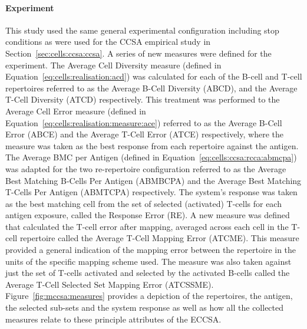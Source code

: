 %
%
\paragraph{Experiment}
This study used the same general experimental configuration including stop conditions as were used for the CCSA empirical study in Section~\ref{sec:cells:ccsa:ccsa}. 
A series of new measures were defined for the experiment. The Average Cell Diversity measure (defined in Equation~\ref{eq:cells:realisation:acd}) was calculated for each of the B-cell and T-cell repertoires referred to as the Average B-Cell Diversity (ABCD), and the Average T-Cell Diversity (ATCD) respectively. This treatment was performed to the Average Cell Error measure (defined in Equation~\ref{eq:cells:realisation:measure:ace}) referred to as the Average B-Cell Error (ABCE) and the Average T-Cell Error (ATCE) respectively, where the measure was taken as the best response from each repertoire against the antigen. The Average BMC per Antigen (defined in Equation~\ref{eq:cells:ccsa:rcca:abmcpa}) was adapted for the two re-repertoire configuration referred to as the Average Best Matching B-Cells Per Antigen (ABMBCPA) and the Average Best Matching T-Cells Per Antigen (ABMTCPA) respectively.
The system's response was taken as the best matching cell from the set of selected (activated) T-cells for each antigen exposure, called the Response Error (RE).
A new measure was defined that calculated the T-cell error after mapping, averaged across each cell in the T-cell repertoire called the Average T-Cell Mapping Error (ATCME). This measure provided a general indication of the mapping error between the repertoire in the units of the specific mapping scheme used. The measure was also taken against just the set of T-cells activated and selected by the activated B-cells called the Average T-Cell Selected Set Mapping Error (ATCSSME).
Figure~\ref{fig:mccsa:measures} provides a depiction of the repertoires, the antigen, the selected sub-sets and the system response as well as how all the collected measures relate to these principle attributes of the ECCSA.

